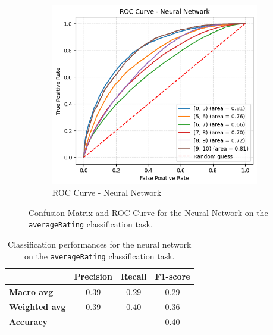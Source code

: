 \begin{figure}[H]
\begin{subfigure}[b]{0.53\textwidth}
        \includegraphics[width=\textwidth]{plotsss/roc_nn_rating.png}
        \caption{ROC Curve - Neural Network}
        \label{fig:roc_nn_rating}
    \end{subfigure}
    \caption{Confusion Matrix and ROC Curve for the Neural Network on the \texttt{averageRating} classification task.}
    \label{fig:cm_roc_nn}
\end{figure}


\begin{table}
    \centering
    \begin{tabular}{lccc}
    \hline
     & \textbf{Precision} & \textbf{Recall} & \textbf{F1-score}\\
    \hline
    \textbf{Macro avg}   & 0.39 & 0.29 & 0.29 \\
    \textbf{Weighted avg}& 0.39 & 0.40 & 0.36 \\
    \hline
    \textbf{Accuracy}    & & & 0.40 \\
    \hline
    \end{tabular}
    \caption{Classification performances for the neural network on the \texttt{averageRating} classification task.}
    \label{tab:nn_report_rating}
\end{table}




